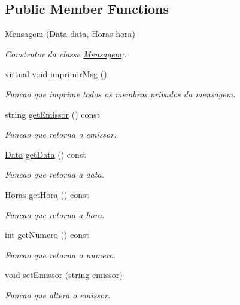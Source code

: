 \subsection*{Public Member Functions}
\begin{DoxyCompactItemize}
\item 
\hyperlink{class_mensagem_a4152f41a1dbfd03eb058d6a9926f4426}{Mensagem} (\hyperlink{class_data}{Data} data, \hyperlink{class_horas}{Horas} hora)
\begin{DoxyCompactList}\small\item\em Construtor da classe \hyperlink{class_mensagem}{Mensagem};. \end{DoxyCompactList}\item 
\hypertarget{class_mensagem_a4490a1cfe88288fa1ff4b41327e769ed}{}virtual void \hyperlink{class_mensagem_a4490a1cfe88288fa1ff4b41327e769ed}{imprimir\+Msg} ()\label{class_mensagem_a4490a1cfe88288fa1ff4b41327e769ed}

\begin{DoxyCompactList}\small\item\em Funcao que imprime todos os membros privados da mensagem. \end{DoxyCompactList}\item 
string \hyperlink{class_mensagem_a5438dfe93aec2e6512042704e134d5db}{get\+Emissor} () const 
\begin{DoxyCompactList}\small\item\em Funcao que retorna o emissor. \end{DoxyCompactList}\item 
\hyperlink{class_data}{Data} \hyperlink{class_mensagem_a8d3b52e1c20fac96c4df60c79b5b7846}{get\+Data} () const 
\begin{DoxyCompactList}\small\item\em Funcao que retorna a data. \end{DoxyCompactList}\item 
\hyperlink{class_horas}{Horas} \hyperlink{class_mensagem_a7285a85c11aea596e25c6f87a68ad86f}{get\+Hora} () const 
\begin{DoxyCompactList}\small\item\em Funcao que retorna a hora. \end{DoxyCompactList}\item 
int \hyperlink{class_mensagem_a376309b58e69c41bf10acb7adad7bd3d}{get\+Numero} () const 
\begin{DoxyCompactList}\small\item\em Funcao que retorna o numero. \end{DoxyCompactList}\item 
void \hyperlink{class_mensagem_a74d42818d3796b28496f400e02328c92}{set\+Emissor} (string emissor)
\begin{DoxyCompactList}\small\item\em Funcao que altera o emissor. \end{DoxyCompactList}\end{DoxyCompactItemize}
